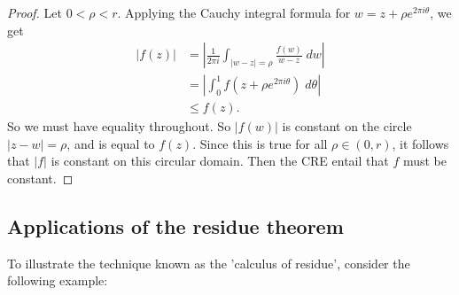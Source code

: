 \documentclass[a4paper]{article}
\begin{document}
\begin{proof}
 Let $0 < \rho < r$. Applying the Cauchy integral formula for $w=z+\rho e^{2\pi i\theta}$, we get
  \begin{align*}
    |f(z)| &= \left|\frac{1}{2\pi i}\int_{|w-z|=\rho} \frac{f(w)}{w - z}\;d w\right|\\
    &= \left|\int_0^1 f(z + \rho e^{2 \pi i \theta})\;d \theta\right|\\
    &\leq f(z).
  \end{align*}
 So we must have equality throughout. So $|f(w)|$ is constant on the circle $|z - w| = \rho$, and is equal to $f(z)$. Since this is true for all $\rho \in (0, r)$, it follows that $|f|$ is constant on this circular domain. Then the CRE entail that $f$ must be constant.
\end{proof}
\subsection{Applications of the residue theorem}
To illustrate the technique known as the 'calculus of residue', consider the following example:
\end{document}
